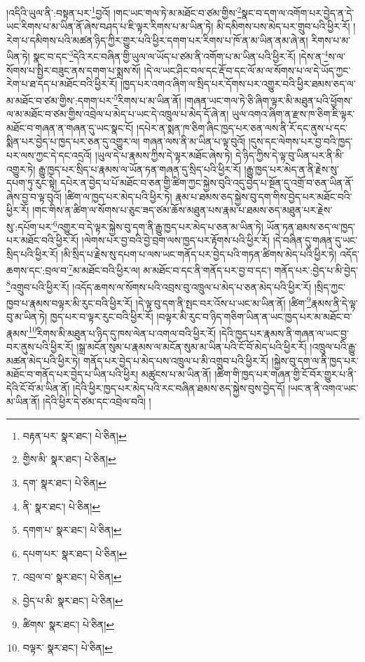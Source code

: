 །འདིའི་ཡུལ་ནི་:བསྟན་པར་\footnote{བརྟན་པར་  སྣར་ཐང་།  པེ་ཅིན། }བྱའོ། །གང་ཡང་གལ་ཏེ་མ་མཐོང་བ་ཙམ་གྱིས་\footnote{གྱིས་མི་  སྣར་ཐང་།  པེ་ཅིན། }སྣང་བ་དག་ལ་འགོག་པར་བྱེད་ན་དེ་ཡང་རིགས་པ་མ་ཡིན་ནོ་ཞེས་བཤད་པ་ཇི་ལྟར་རིགས་པ་མ་ཡིན་ཏེ། མི་དམིགས་པས་མེད་པར་གྲུབ་པའི་ཕྱིར་རོ། །རེག་པ་དམིགས་པའི་མཚན་ཉིད་ཀྱིར་གྱུར་པའི་ཕྱིར་དགག་པར་རིགས་པ་ཁོ་ན་མ་ཡིན་ནམ་ཞེ་ན། རིགས་པ་མ་ཡིན་ཏེ། སྣང་བ་དང་\footnote{དག་  སྣར་ཐང་།  པེ་ཅིན། }དེའི་རང་བཞིན་གྱི་ཡུལ་ལ་ཡོད་པ་ཙམ་ནི་འགོག་པ་མ་ཡིན་པའི་ཕྱིར་རོ། །དེས་ན་\footnote{ནི་  སྣར་ཐང་།  པེ་ཅིན། }ས་ལ་སོགས་པ་སྤྱིར་བཟུང་ནས་དགག་པ་སྨྲས་སོ། །དེ་ལ་ཡང་ཤིང་བལ་དང་རྡོ་བ་དང་ལོ་མ་ལ་སོགས་པ་ལ་དེ་ཡོད་ཀྱང་རེག་པ་ཐ་དད་པ་མཐོང་བའི་ཕྱིར་རོ། །ཁྱད་པར་འགའ་ཞིག་ལ་སྲིད་པར་དོགས་པར་འགྱུར་བའི་ཕྱིར་ཐམས་ཅད་ལ་མ་མཐོང་བ་ཙམ་གྱིས་:དགག་པར་\footnote{དགག་པ་  སྣར་ཐང་།  པེ་ཅིན། }རིགས་པ་མ་ཡིན་ནོ། །གཞན་ཡང་གལ་ཏེ་ཅི་ཞིག་ལྟར་མི་མཐུན་པའི་ཕྱོགས་ལ་མ་མཐོང་བ་ཙམ་གྱིས་འབྲེལ་པ་མེད་པ་ཡང་དེ་འཁྲུལ་པ་མེད་དོ་ཞེ་ན། ཡུལ་འགའ་ཞིག་ན་རྫས་ཁ་ཅིག་ཇི་ལྟར་མཐོང་བ་གཞན་ན་གཞན་དུ་ཡང་སྣང་ངོ། །དཔེར་ན་སྨན་ཁ་ཅིག་ཞིང་ཁྱད་པར་ཅན་ལས་ནི་རོ་དང་ནུས་པ་དང་སྨིན་པར་བྱེད་པ་ཁྱད་པར་ཅན་དུ་འགྱུར་ལ། གཞན་ལས་ནི་མ་ཡིན་པ་ལྟ་བུའོ། །དུས་དང་ལེགས་པར་བྱ་བའི་ཁྱད་པར་ལས་ཀྱང་དེ་དང་འདྲའོ། །ཡུལ་དེ་པ་རྣམས་ཀྱིས་དེ་ལྟར་མཐོང་ཞེས་ཏེ། དེ་ཉིད་ཀྱིས་དེ་ལྟ་བུ་ཡིན་པར་ནི་མི་འགྱུར་ཏེ། རྒྱུ་ཁྱད་པར་སྲིད་པ་རྣམས་ལ་ཡོན་ཏན་གཞན་དུ་སྲིད་པའི་ཕྱིར་རོ། །རྒྱུ་ཁྱད་པར་མེད་ན་ནི་རྗེས་སུ་དཔག་ཏུ་རུང་སྟེ། དཔེར་ན་བྱེད་པ་པོ་མཐོང་བ་ཅན་གྱི་ཚིག་ཀྱང་སྐྱེས་བུའི་འདུ་བྱེད་པ་སྔོན་དུ་འགྲོ་བ་ཅན་ཡིན་ནོ་ཞེས་བྱ་བ་ལྟ་བུའོ། །ཚིག་ལ་ཁྱད་པར་མེད་པའི་ཕྱིར་ཏེ། རྣམ་པ་ཐམས་ཅད་སྐྱེས་བུ་དག་གིས་བྱེད་པར་མཐོང་བའི་ཕྱིར་རོ། །གང་གིས་ན་ཚིག་ལ་སོགས་པ་ཅུང་ཟད་ཙམ་ཆོས་མཐུན་པས་རྣམ་པ་ཐམས་ཅད་མཐུན་པར་རྗེས་སུ་:དཔོག་པར་\footnote{དཔག་པར་  སྣར་ཐང་།  པེ་ཅིན། }འགྱུར་བ་དེ་ལྟར་སྐྱེས་བུ་དག་ནི་རྒྱུ་ཁྱད་པར་མེད་པ་ཅན་མ་ཡིན་ཏེ། ཡོན་ཏན་ཐམས་ཅད་ལ་ཁྱད་པར་མཐོང་བའི་ཕྱིར་རོ། །ལེགས་པར་བྱ་བའི་བྱེ་བྲག་ལས་ཁྱད་པར་རྟོགས་པའི་ཕྱིར་རོ། །དེ་བཞིན་དུ་གཞན་དུ་ཡང་སྲིད་པའི་ཕྱིར་རོ། །མི་སྲིད་པ་རྗེས་སུ་དཔག་པ་ལས་ཡང་གནོད་པར་བྱེད་པའི་གཏན་ཚིགས་མེད་པའི་ཕྱིར་ཏེ། འདོད་ཆགས་དང་:བྲལ་བ་\footnote{འབྲལ་བ་  སྣར་ཐང་།  པེ་ཅིན། }མ་མཐོང་བའི་ཕྱིར་ལ། མ་མཐོང་བ་དང་ནི་གནོད་པར་བྱ་བ་དང་། གནོད་པར་:བྱེད་པ་མི་བྱེད་\footnote{བྱེད་པ་མི་  སྣར་ཐང་།  པེ་ཅིན། }འགྲུབ་པའི་ཕྱིར་རོ། །འདོད་ཆགས་ལ་སོགས་པའི་འབྲས་བུ་འཁྲུལ་པ་མེད་པ་ཅན་མེད་པའི་ཕྱིར་རོ། །སྲིད་ཀྱང་ཁྱབ་པ་རྣམས་བལྟར་མི་རུང་བའི་ཕྱིར་རོ། །དེ་ལྟ་བུ་དག་ནི་སྤང་བར་འོས་པ་ཡང་མ་ཡིན་ནོ། །ཚིག་\footnote{ཚིགས་  སྣར་ཐང་།  པེ་ཅིན། }རྣམས་ནི་དེ་ལྟ་བུ་མ་ཡིན་ཏེ། ཁྱད་པར་བ་ལྟར་རུང་བའི་ཕྱིར་རོ། །བལྟར་མི་རུང་བ་ཉིད་གཅིག་ཡིན་ན་ཡང་ཁྱད་པར་མ་མཐོང་བ་རྣམས་\footnote{བལྟར་  སྣར་ཐང་།  པེ་ཅིན། }རིགས་མི་མཐུན་པ་ཉིད་དུ་ཁས་ལེན་པ་འགལ་བའི་ཕྱིར་རོ། །དེའི་ཁྱད་པར་རྣམས་ནི་གཞན་ལ་ཡང་བྱ་བར་ནུས་པའི་ཕྱིར་རོ། །སྒྲ་མངོན་སུམ་པ་རྣམས་ལ་མངོན་སུམ་མ་ཡིན་པའི་ངོ་བོ་མེད་པའི་ཕྱིར་རོ། །འཁྲུལ་པའི་རྒྱུ་མཚན་མེད་པའི་ཕྱིར་ཏེ། གནོད་པར་བྱེད་པ་མེད་པས་འཁྲུལ་པ་མི་འགྲུབ་པའི་ཕྱིར་རོ། །སྐྱེས་བུ་དག་ལ་ནི་ཁྱད་པར་མཐོང་བ་གནོད་པར་བྱེད་པ་ཡིན་པའི་ཕྱིར། མཚུངས་པ་མ་ཡིན་ནོ། །ཚིག་གི་ཁྱད་པར་གཞན་གྱི་ངོ་བོར་གྱུར་པ་ནི་དེའི་ངོ་བོ་མ་ཡིན་ནོ། །དེའི་ཕྱིར་ཁྱད་པར་མེད་པའི་རང་བཞིན་ཐམས་ཅད་སྐྱེས་བུས་བྱེད་དོ། །ཡང་ན་ནི་འགའ་ཡང་མ་ཡིན་ནོ། །དེའི་ཕྱིར་དེ་ཙམ་དང་འབྲེལ་བའི། །
